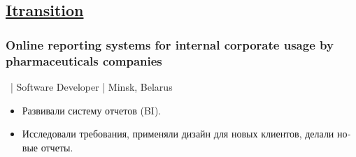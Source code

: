 \documentclass[a4paper]{article}
\newcommand{\periodandlocation}[1]{{\small #1}}
\begin{document}
\begin{minipage}[t]{0.55\textwidth}
    \subsection*{\href{http://www.itransition.com/}{Itransition}}
	\subsubsection*{Online reporting systems for internal corporate usage by pharmaceuticals companies}
    \periodandlocation{\ | Software Developer | Minsk, Belarus}
	\begin{otherlanguage}{russian}
      \begin{itemize}
        \item Развивали систему отчетов (BI). 
        \item Исследовали требования, применяли дизайн для новых клиентов, делали новые отчеты.
      \end{itemize}
	\end{otherlanguage}
  \end{minipage}
\end{document}
